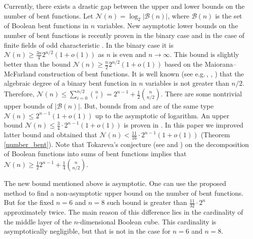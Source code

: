 \documentclass[a4paper,12pt]{article}   %
\begin{document}
Currently, there exists a drastic gap between the upper and lower
bounds on the number of bent functions. Let
$\mathcal{N}(n)=\log_2|\mathcal{B}(n)|$, where $\mathcal{B}(n)$ is
the set  of Boolean bent functions in $n$ variables.
 New   asymptotic  lower
bounds  on the number of bent functions is recently proven in the
binary case \cite{PTT}  and  in the case of  finite fields of odd
characteristic \cite{PF}. In the binary case it is
$\mathcal{N}(n)\geq \frac{3n}{4}2^{n/2}(1+o(1))$ as $n$ is even and
$n\rightarrow\infty$.   This bound is slightly better than the bound
$\mathcal{N}(n)\geq \frac{n}{2}2^{n/2}(1+o(1))$ based on the
Maiorana--McFarland construction of bent functions. It is well known
(see e.g.\,\cite{Carlet}, \cite{CarMes}, \cite{Mes0}) that the
algebraic degree of a binary bent function in $n$ variables is not
greater than $n/2$. Therefore, $\mathcal{N}(n)\leq
{\sum\limits_{i=0}^{n/2} {n \choose i}}= 2^{n-1}+ \frac12{n \choose
n/2} $. There are some nontrivial upper bounds of
$|\mathcal{B}(n)|$. But, bounds from \cite{CK} and \cite{Ag1} are of
the same type $\mathcal{N}(n)\leq 2^{n-1}(1+o(1))$ up to the
asymptotic of logarithm.
 An
 upper bound $\mathcal{N}(n)\leq \frac{3}{4}\cdot2^{n-1}(1+o(1))$
 is proven in \cite{P21}. In this paper we improved latter
  bound and obtained that $\mathcal{N}(n)< \frac{11}{16}\cdot2^{n-1}(1+o(1))$ (Theorem \ref{number_bent}).
 Note that
Tokareva's conjecture (see \cite{Tok} and \cite{Mes0}) on the
decomposition of Boolean functions into sums of bent functions
implies that $\mathcal{N}(n)\geq \frac{1}{2}2^{n-1}+\frac14{n
\choose n/2}$.


The new bound mentioned above  is asymptotic. One can use the
proposed method to find a non-asymptotic upper bound on the number
of bent functions. But for the fixed $n=6$ and $n=8$ such bound is
greater than $\frac{11}{32}\cdot2^{n}$ approximately twice. The main
reason of this difference lies in the cardinality of the middle
layer of the $n$-dimensional Boolean cube. This cardinality is
asymptotically negligible, but that is not in the case for $n=6$ and
$n=8$.
\end{document}
